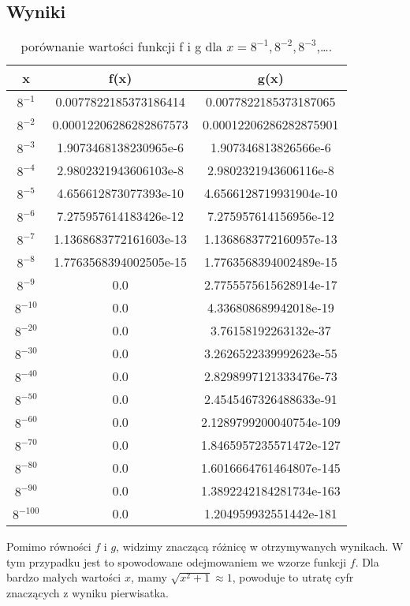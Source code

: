 \documentclass{article}
\begin{document}
\begin{center}
    \subsection{Wyniki}
    \begin{table}[h!]
        \centering
        \begin{tabular}{||c c c||} 
        \hline
        \textbf{x} & \textbf{f(x)} & \textbf{g(x)}  \\ [0.5ex]
        \hline\hline
         \(8^{-1}\) & 0.0077822185373186414 & 0.0077822185373187065 \\ 
         \(8^{-2}\) & 0.00012206286282867573  & 0.00012206286282875901 \\
         \(8^{-3}\) & 1.9073468138230965e-6 & 1.907346813826566e-6 \\ 
         \(8^{-4}\) & 2.9802321943606103e-8  & 2.9802321943606116e-8 \\ 
         \(8^{-5}\) & 4.656612873077393e-10  & 4.6566128719931904e-10 \\ 
         \(8^{-6}\) & 7.275957614183426e-12  & 7.275957614156956e-12 \\ 
         \(8^{-7}\) & 1.1368683772161603e-13 &  1.1368683772160957e-13 \\ 
         \(8^{-8}\) & 1.7763568394002505e-15 & 1.7763568394002489e-15 \\ 
         \(8^{-9}\) & 0.0 & 2.7755575615628914e-17 \\ 
         \(8^{-10}\) & 0.0 & 4.336808689942018e-19 \\ 
         \(8^{-20}\) & 0.0 & 3.76158192263132e-37 \\ 
         \(8^{-30}\) & 0.0 & 3.2626522339992623e-55 \\ 
         \(8^{-40}\) & 0.0 & 2.8298997121333476e-73 \\ 
         \(8^{-50}\) & 0.0 & 2.4545467326488633e-91 \\ 
         \(8^{-60}\) & 0.0 & 2.1289799200040754e-109 \\ 
         \(8^{-70}\) & 0.0 & 1.8465957235571472e-127 \\ 
         \(8^{-80}\) & 0.0 & 1.6016664761464807e-145 \\ 
         \(8^{-90}\) & 0.0 & 1.3892242184281734e-163 \\ 
         \(8^{-100}\) & 0.0 & 1.204959932551442e-181 \\ 
        \hline
        \end{tabular}
        \caption{porównanie wartości funkcji f i g dla \(x = 8^{-1},8^{-2},8^{-3}\),\ldots.}
        \label{table:5}
        \end{table}
        Pomimo równości \(f\) i \(g\), widzimy znaczącą różnicę w otrzymywanych wynikach.
        W tym przypadku jest to spowodowane odejmowaniem we wzorze funkcji \(f\).
        Dla bardzo małych wartości \(x\), mamy \(\textstyle \sqrt{x^2 + 1} \approx 1\), powoduje to utratę cyfr znaczących z wyniku pierwisatka.

\end{center}
\end{document}
